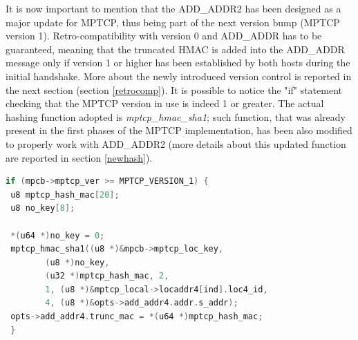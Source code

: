 It is now important to mention that the ADD\_ADDR2 has been designed as a major update for MPTCP, thus being part of the next version bump (MPTCP version 1). Retro-compatibility with version 0 and ADD\_ADDR has to be guaranteed, meaning that the truncated HMAC is added into the ADD\_ADDR message only if version 1 or higher has been established by both hosts during the initial handshake. More about the newly introduced version control is reported in the next section (section \ref{retrocomp}). It is possible to notice the "if" statement checking that the MPTCP version in use is indeed 1 or greater. The actual hashing function adopted is \textit{mptcp\_hmac\_sha1}; such function, that was already present in the first phases of the MPTCP implementation, has been also modified to properly work with ADD\_ADDR2 (more details about this updated function are reported in section \ref{newhash}). 

\begin{lstlisting}[language=c, caption=\textit{New ADD\_ADDR HMAC calculation (outgoing packet, IPv4)}, label=fullmesh]
 if (mpcb->mptcp_ver >= MPTCP_VERSION_1) {
 u8 mptcp_hash_mac[20];
 u8 no_key[8];

 *(u64 *)no_key = 0;
 mptcp_hmac_sha1((u8 *)&mpcb->mptcp_loc_key,
 		(u8 *)no_key,
		(u32 *)mptcp_hash_mac, 2,
		1, (u8 *)&mptcp_local->locaddr4[ind].loc4_id,
		4, (u8 *)&opts->add_addr4.addr.s_addr);
 opts->add_addr4.trunc_mac = *(u64 *)mptcp_hash_mac;
 }
\end{lstlisting}

